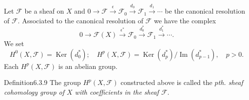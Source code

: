 Let $\mathcal F$ be a sheaf on $X$ and $0\to\mathcal F\xrightarrow\epsilon\mathcal F_0\xrightarrow{d_0}\mathcal F_1\xrightarrow{d_1}\cdots$ be the canonical resolution of $\mathcal F$. Associated to the canonical resolution of $\mathcal F$ we have the complex
\[
0\to\mathcal F(X)\xrightarrow{\epsilon^*}\mathcal F_0\xrightarrow{d_0^*}\mathcal F_1\xrightarrow{d_1^*}\cdots.
\]
We set
\[
H^0(X,\mathcal F)=\operatorname{Ker}(d_0^*);\quad H^p(X,\mathcal F)=\operatorname{Ker}(d_p^*)/\operatorname{Im}(d_{p-1}^*),\quad p>0.
\]
Each $H^p(X,\mathcal F)$ is an abelian group.
\begin{originaltheorem}{Definition}{6.3.9}
The group $H^p(X,\mathcal F)$ constructed above is called the \emph{$p$th. sheaf cohomology group of $X$ with coefficients in the sheaf $\mathcal F$}.
\end{originaltheorem}
